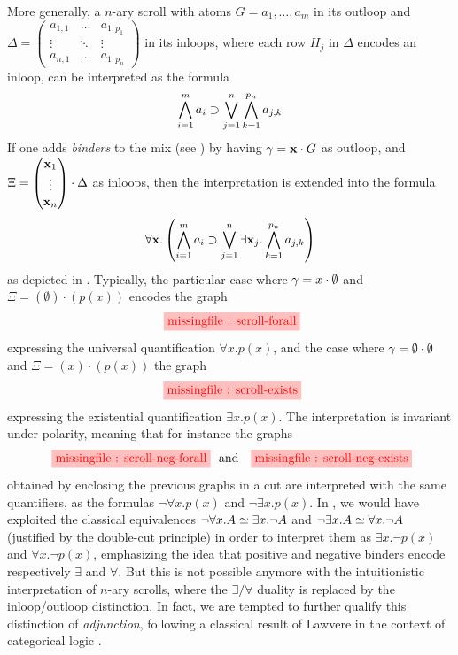 More generally, a $n$-ary scroll with atoms $G = a_1, \ldots, a_m$ in its outloop and
$\Delta = \begin{pmatrix}
  a_{1,1} & \ldots & a_{1,p_1} \\
  \vdots & \ddots & \vdots \\
  a_{n,1} & \ldots & a_{1,p_n}
\end{pmatrix}$
in its inloops, where each row $H_j$ in $\Delta$ encodes an inloop, can be
interpreted as the formula
$$\bigwedge_{i = 1}^{m}{a_i} \supset \bigvee_{j = 1}^{n}\bigwedge_{k = 1}^{p_n}{a_{j,k}}$$
If one adds \emph{binders} to the mix (see ) by having $\gamma =
\mathbf{x} \cdot G$ as outloop, and
$\Xi = \begin{pmatrix}
  \mathbf{x}_1 \\
  \vdots \\
  \mathbf{x}_n
\end{pmatrix} \cdot \Delta$ as inloops, then the interpretation is extended into
the formula
$$\forall \mathbf{x}. \left(\bigwedge_{i = 1}^{m}{a_i} \supset \bigvee_{j = 1}^{n}\exists \mathbf{x}_j. \bigwedge_{k = 1}^{p_n}{a_{j,k}}\right)$$
as depicted in . Typically, the particular case where $\gamma
= x \cdot \emptyset$ and $\Xi = (\emptyset) \cdot (p(x))$ encodes the graph
$$\stkfig{1}{scroll-forall}$$
expressing the universal quantification $\forall x. p(x)$, and the case where
$\gamma = \emptyset \cdot \emptyset$ and $\Xi = (x) \cdot (p(x))$ the graph
$$\stkfig{1}{scroll-exists}$$
expressing the existential quantification $\exists x. p(x)$. The interpretation
is invariant under polarity, meaning that for instance the graphs
$$\stkfig{1}{scroll-neg-forall} \text{   and   } \stkfig{1}{scroll-neg-exists}$$
obtained by enclosing the previous graphs in a cut are interpreted with the same
quantifiers, as the formulas $\neg \forall x. p(x)$ and $\neg \exists x. p(x)$.
In , we would have exploited the classical equivalences $\neg \forall
x. A \simeq \exists x. \neg A$ and $\neg \exists x. A \simeq \forall x.
\neg A$ (justified by the double-cut principle) in order to interpret them as
$\exists x. \neg p(x)$ and $\forall x. \neg p(x)$, emphasizing the idea that
positive and negative binders encode respectively $\exists$ and $\forall$. But
this is not possible anymore with the intuitionistic interpretation of $n$-ary
scrolls, where the $\exists/\forall$ duality is replaced by the inloop/outloop
distinction. In fact, we are tempted to further qualify this distinction of
\emph{adjunction}, following a classical result of Lawvere in the context of
categorical logic .

